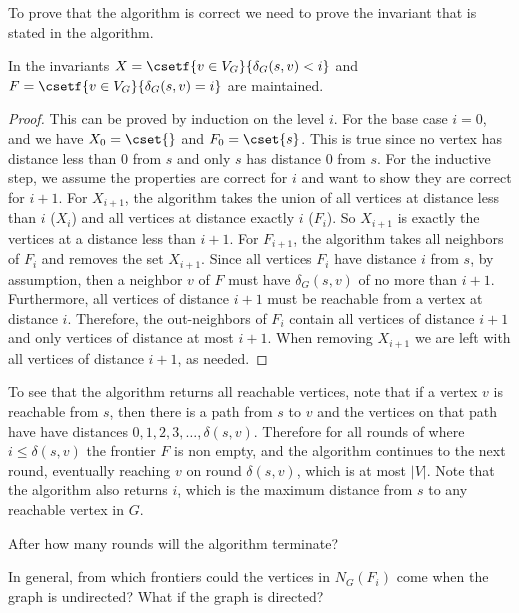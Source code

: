 To prove that the algorithm is correct we need to prove the invariant
that is stated in the algorithm.  

\begin{lemma}
\label{lem:bfs::main}
In  the invariants $X = \csetf{v \in V_G}{\delta_G(s, v) < i}$
and $F = \csetf{v \in V_G}{\delta_G(s, v) = i}$ are maintained.
\end{lemma}
\begin{proof}
This can be proved by induction on the level $i$.  For the base case
$i = 0$, and we have $X_0 = \cset{}$ and $F_0 = \cset{s}$.
%
This is true since no vertex has distance less than 0 from $s$ and
only $s$ has distance 0 from $s$.  For the inductive step, we assume
the properties are correct for $i$ and want to show they are correct for $i+1$.  For
$X_{i+1}$, the algorithm takes the union of all vertices at distance
less than $i$ ($X_i$) and all vertices at distance exactly $i$
($F_i$). So $X_{i+1}$ is exactly the vertices at a distance less than
$i+1$.  
%
For $F_{i+1}$, the algorithm takes all neighbors of $F_i$ and
removes the set $X_{i+1}$.  Since all vertices $F_i$ have distance $i$
from $s$, by assumption, then a neighbor $v$ of $F$ must have
$\delta_G(s,v)$ of no more than $i+1$.  
%
Furthermore, all vertices of distance $i+1$ must be reachable from a
vertex at distance $i$.  Therefore, the out-neighbors of $F_i$ contain all
vertices of distance $i+1$ and only vertices of distance at most
$i+1$.  When removing $X_{i+1}$ we are left with all vertices of
distance $i+1$, as needed.
\end{proof}

To see that the algorithm returns all reachable vertices, note that if
a vertex $v$ is reachable from $s$, then there
is a path from $s$ to $v$ and the vertices on that path have
have distances $0, 1, 2, 3, \ldots, \delta(s,v)$.   
Therefore for all rounds of  where $i \leq \delta(s,v)$ the frontier
$F$ is non empty, and the algorithm continues to the next round,
eventually reaching $v$ on round $\delta(s,v)$, which is at most $|V|$.
Note that the algorithm also returns $i$, which is the maximum
distance from $s$ to any reachable vertex in $G$.

%
\begin{question}
After how many rounds will the algorithm terminate?
\end{question}
%

\begin{exercise} 
In general, from which frontiers could the vertices in $N_G(F_i)$ come
when the graph is undirected?  What if the graph is directed?
\end{exercise}

